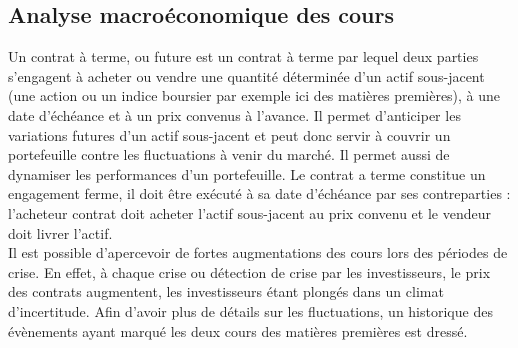 \subsection{Analyse macroéconomique des cours}
Un contrat à terme, ou future est un contrat à terme par lequel deux parties s'engagent à acheter ou vendre une quantité déterminée d'un actif sous-jacent (une 
action ou un indice boursier par exemple ici des matières premières), à une date d'échéance et à un prix convenus à l'avance. Il permet d'anticiper les variations futures 
d'un actif sous-jacent et peut donc servir à couvrir un portefeuille contre les fluctuations à venir du marché. Il permet aussi de dynamiser les performances d'un 
portefeuille. Le contrat a terme constitue un engagement ferme, il doit être exécuté à sa date d'échéance par ses contreparties : l'acheteur contrat doit acheter l'actif 
sous-jacent au prix convenu et le vendeur doit livrer l'actif.\\[11pt]
Il est possible d'apercevoir de fortes augmentations des cours lors des périodes de crise. En effet, à chaque crise ou détection de crise par les investisseurs, le prix 
des contrats augmentent, les investisseurs étant plongés dans un climat d'incertitude. Afin d'avoir plus de détails sur les fluctuations, un historique des évènements 
ayant marqué les deux cours des matières premières est dressé.
